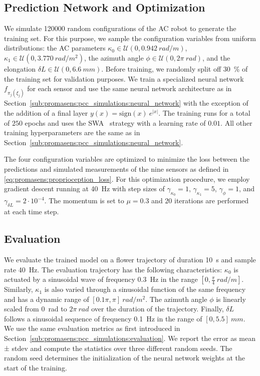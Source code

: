 \subsection{Prediction Network and Optimization}\label{sub:promasens:ac_simulations:network_optimization}
We simulate \SI{120000}{} random configurations of the \gls{AC} robot to generate the training set. For this purpose, we sample the configuration variables from uniform distributions: the \gls{AC} parameters $\kappa_0 \in \mathcal{U}(0, \SI{0.942}{rad \per m})$, $\kappa_1 \in \mathcal{U}(0, \SI{3.770}{rad \per m^2})$, the azimuth angle $\phi \in \mathcal{U}(0, 2 \pi \: \si{rad})$, and the elongation $\delta L \in \mathcal{U}(0, \SI{6.6}{mm})$.
Before training, we randomly split off \SI{30}{\percent} of the training set for validation purposes.
We train a specialized neural network $f_{\pi_j(\xi_j)}$ for each sensor and use the same neural network architecture as in Section~\ref{sub:promasens:pcc_simulations:neural_network} with the exception of the addition of a final layer $y(x) = \mathrm{sign}(x) \: e^{|x|}$. 
The training runs for a total of $250$ epochs and uses the SWA~\citep{izmailov2018averaging} strategy with a learning rate of $0.01$. 
All other training hyperparameters are the same as in Section~\ref{sub:promasens:pcc_simulations:neural_network}.

The four configuration variables are optimized to minimize the loss between the predictions and simulated measurements of the nine sensors as defined in \ref{eq:promasens:proprioception_loss}.
For this optimization procedure, we employ gradient descent running at \SI{40}{Hz} with step sizes of $\gamma_{\kappa_0} = 1$, $\gamma_{\kappa_1} = 5$, $\gamma_{\phi} = 1$, and $\gamma_{\delta L} = 2 \cdot 10^{-4}$. The momentum is set to $\mu = 0.3$ and $20$ iterations are performed at each time step.

\subsection{Evaluation}\label{sub:promasens:ac_simulations:evaluation}
We evaluate the trained model on a flower trajectory of duration \SI{10}{s} and sample rate \SI{40}{Hz}. The evaluation trajectory has the following characteristics: $\kappa_0$ is actuated by a sinusoidal wave of frequency \SI{0.3}{Hz} in the range $[0, \frac{\pi}{4} \: \si{rad \per m}]$. Similarly, $\kappa_1$ is also varied through a sinusoidal function of the same frequency and has a dynamic range of $[0.1 \pi, \pi] \: \si{rad \per m^2}$.
The azimuth angle $\phi$ is linearly scaled from \SI{0}{rad} to $2 \pi \: \si{rad}$ over the duration of the trajectory.
Finally, $\delta L$ follows a sinusoidal sequence of frequency \SI{0.1}{Hz} in the range of $[0, 5.5] \: \si{mm}$.
We use the same evaluation metrics as first introduced in Section~\ref{sub:promasens:pcc_simulations:evaluation}.
We report the error as mean ± stdev and compute the statistics over three
different random seeds. The random seed determines the initialization of the neural network weights at the start of the training.

